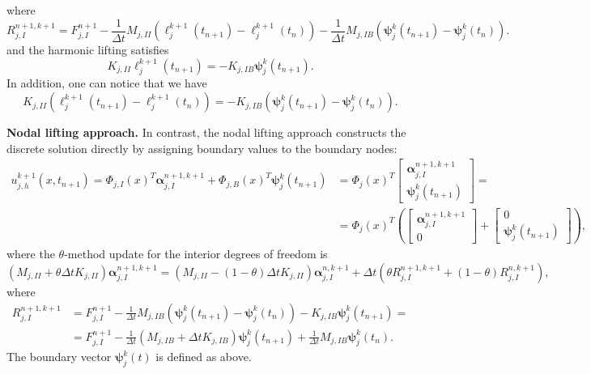 \documentclass[a4paper, 11pt]{article}
\theoremstyle{remark}
\begin{document}
where
\begin{equation*}
    R^{n+1, k+1}_{j, I} =  F^{n+1}_{j, I} - \frac{1}{\Delta t}M_{j, II}\left(\boldsymbol{\ell}_{j}^{k+1}(t_{n+1}) - \boldsymbol{\ell}_{j}^{k+1}(t_{n})\right) - \frac{1}{\Delta t}M_{j, IB}\left(\boldsymbol{\psi}_{j}^{k}(t_{n+1}) - \boldsymbol{\psi}_{j}^{k}(t_{n})\right).
\end{equation*}
and the harmonic lifting satisfies
\begin{equation*}
    K_{j, II}\boldsymbol{\ell}_{j}^{k+1}(t_{n+1}) = - K_{j, IB}\boldsymbol{\psi}_{j}^{k}(t_{n+1}).
\end{equation*}
In addition, one can notice that we have
\begin{equation*}
    K_{j, II}\left(\boldsymbol{\ell}_{j}^{k+1}(t_{n+1}) - \boldsymbol{\ell}_{j}^{k+1}(t_{n})\right) = - K_{j, IB}\left(\boldsymbol{\psi}_{j}^{k}(t_{n+1}) - \boldsymbol{\psi}_{j}^{k}(t_{n})\right).
\end{equation*}

\noindent \textbf{Nodal lifting approach.} 
In contrast, the nodal lifting approach constructs the discrete solution directly by assigning boundary values to the boundary nodes:
\begin{align*}
    u^{k+1}_{j, h}(x, t_{n+1}) = \Phi_{j, I}(x)^{T}\boldsymbol{\alpha}_{j, I}^{n+1, k+1} + \Phi_{j, B}(x)^{T}\boldsymbol{\psi}_{j}^{k}(t_{n+1}) &= \Phi_{j}(x)^{T}
    \begin{bmatrix}
        \boldsymbol{\alpha}_{j, I}^{n+1, k+1}\\[1ex]
        \boldsymbol{\psi}_{j}^{k}(t_{n+1})
    \end{bmatrix} = \\
    &=\Phi_{j}(x)^{T}\left(
    \begin{bmatrix}
        \boldsymbol{\alpha}_{j, I}^{n+1, k+1}\\[1ex]
        0
    \end{bmatrix} +
    \begin{bmatrix}
        0\\[1ex]
        \boldsymbol{\psi}_{j}^{k}(t_{n+1})
    \end{bmatrix}\right),
\end{align*}
where the $\theta$-method update for the interior degrees of freedom is
\begin{equation*}
    \left(M_{j, II} + \theta\Delta t K_{j, II}\right) \boldsymbol{\alpha}_{j, I}^{n+1, k+1} = \left(M_{j, II} - (1-\theta)\Delta t K_{j, II}\right)\boldsymbol{\alpha}_{j, I}^{n, k+1} + \Delta t\left(\theta R^{n+1, k+1}_{j, I} + (1-\theta)R^{n, k+1}_{j, I}\right),
\end{equation*}
where
\begin{align*}
    R^{n+1, k+1}_{j, I} &=F^{n+1}_{j, I} - \frac{1}{\Delta t}M_{j, IB}\left(\boldsymbol{\psi}_{j}^{k}(t_{n+1}) - \boldsymbol{\psi}_{j}^{k}(t_{n})\right) - K_{j, IB}\boldsymbol{\psi}_{j}^{k}(t_{n+1}) =\\
    &= F^{n+1}_{j, I} - \frac{1}{\Delta t}\left(M_{j, IB} +\Delta t K_{j, IB}\right)\boldsymbol{\psi}_{j}^{k}(t_{n+1}) + \frac{1}{\Delta t}M_{j, IB}\boldsymbol{\psi}_{j}^{k}(t_{n}).
\end{align*}
The boundary vector $\boldsymbol{\psi}_{j}^{k}(t)$ is defined as above. 
\end{document}
